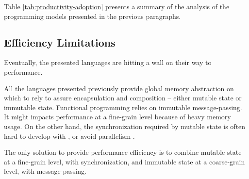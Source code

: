 
\separator

Table \ref{tab:productivity-adoption} presents a summary of the analysis of the programming models presented in the previous paragraphs.


\subsection{Efficiency Limitations} \label{chapter3:software-productivity:efficiency-limitations}

Eventually, the presented languages are hitting a wall on their way to performance.

All the languages presented previously provide global memory abstraction on which to rely to assure encapsulation and composition -- either mutable state or immutable state.
Functional programming relies on immutable message-passing.
It might impacts performance at a fine-grain level because of heavy memory usage.
On the other hand, the synchronization required by mutable state is often hard to develop with \cite{Adya2002}, or avoid parallelism \cite{Pai1999,Krohn2007}.

The only solution to provide performance efficiency is to combine mutable state at a fine-grain level, with synchronization, and immutable state at a coarse-grain level, with message-passing.





